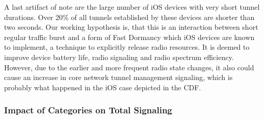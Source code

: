 A last artifact of note are the large number of iOS devices with very short tunnel durations. Over 20\% of all tunnels established by these devices are shorter than two seconds. Our working hypothesis is, that this is an interaction between short regular traffic burst and a form of Fast Dormancy \cite{gsma2011fdbestpract} which iOS devices are known to implement, a technique to explicitly release radio resources. It is deemed to improve device battery life, radio signaling and radio spectrum efficiency. However, due to the earlier and more frequent radio state changes, it also could cause an increase in core network tunnel management signaling, which is probably what happened in the iOS case depicted in the CDF.



\subsubsection{Impact of Categories on Total Signaling}



